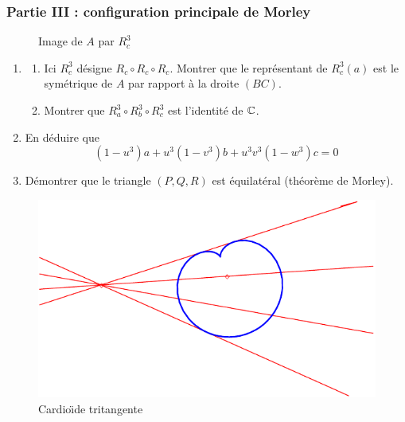 \subsubsection*{Partie III : configuration principale de Morley}
\begin{figure}[ht]
  \centering
  
  \caption{Image de $A$ par $R_c^3$}
  \label{fig:Etrisec_4}
\end{figure}
\begin{enumerate}
  \item
    \begin{enumerate}
        \item Ici $R_c^3$ d{\'e}signe $R_c \circ R_c \circ R_c$. Montrer que le repr{\'e}sentant de $R_c^3(a)$ est le sym{\'e}trique de $A$ par rapport {\`a} la droite $(BC)$.
        \item Montrer que $R_a^3 \circ R_b^3 \circ R_c^3$ est l'identit{\'e} de $\mathbb{C}$.
    \end{enumerate}

  \item En d{\'e}duire que
  \[(1-u^3)a+u^3(1-v^3)b+u^3v^3(1-w^3)c=0\]
  \item D{\'e}montrer que le triangle $(P,Q,R)$ est {\'e}quilat{\'e}ral (th{\'e}or{\`e}me de Morley).
\end{enumerate}
\begin{figure}[ht]
 \centering
  \includegraphics{Etrisec_2.pdf}
  \caption{Cardio{\"\i}de tritangente}
  \label{fig:Etrisec_2}
\end{figure}

